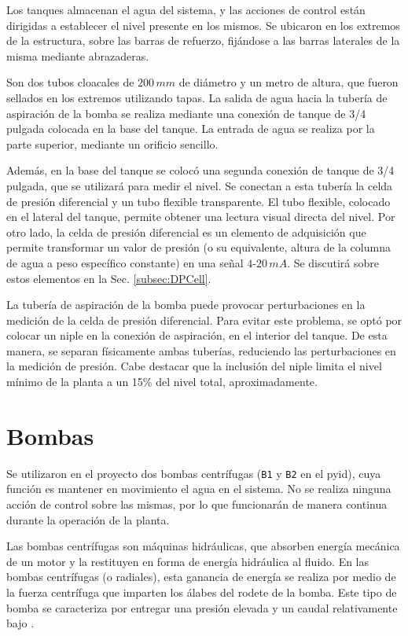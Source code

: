 Los tanques almacenan el agua del sistema, y las acciones de
control están dirigidas a establecer el nivel presente en los mismos.
Se ubicaron en los extremos de la estructura, sobre las barras de 
refuerzo, fijándose a las barras laterales de la misma mediante
abrazaderas.

Son dos tubos cloacales de $200\,mm$ de diámetro y un metro de altura, que
fueron sellados en los extremos utilizando tapas.
La salida de agua hacia la tubería de aspiración de la bomba se realiza
mediante una conexión de tanque de 3/4 pulgada colocada en la base del tanque.
La entrada de agua se realiza por la parte superior, mediante un orificio
sencillo.

Además, en la base del tanque se colocó una segunda conexión de tanque de 3/4
pulgada, que se utilizará para medir el nivel.
Se conectan a esta tubería la celda de presión diferencial y un tubo
flexible transparente.
El tubo flexible, colocado en el lateral del tanque, permite obtener una
lectura visual directa del nivel.
Por otro lado, la celda de presión diferencial es un elemento de adquisición
que permite transformar un valor de presión (o su equivalente, altura de la
columna de agua a peso específico constante) en
una señal $4$-$20\,mA$.
Se discutirá sobre estos elementos en la Sec. \ref{subsec:DPCell}.

La tubería de aspiración de la bomba puede provocar
perturbaciones en la medición de la celda de presión diferencial.
Para evitar este problema, se optó por
colocar un niple en la conexión de aspiración, en el interior del tanque.
De esta manera, se separan físicamente ambas tuberías, reduciendo las
perturbaciones en la medición de presión.
Cabe destacar que la inclusión del niple limita el nivel mínimo de la planta a
un 15\% del nivel total, aproximadamente.

\section{Bombas}
\label{sec:Bombas}

Se utilizaron en el proyecto dos bombas centrífugas (\verb|B1| y \verb|B2| en
el \gls{pyid}), cuya función es
mantener en movimiento el agua en el sistema.
No se realiza ninguna acción de control sobre las
mismas, por lo que funcionarán de manera continua durante la operación de la
planta.

Las bombas centrífugas son máquinas hidráulicas, que absorben energía mecánica
de un motor y la restituyen en forma de energía hidráulica al fluido.
En las bombas centrífugas (o radiales), esta ganancia de energía se realiza por
medio de la fuerza centrífuga que imparten los álabes del rodete de la bomba.
Este tipo de bomba se caracteriza por entregar una presión elevada y un caudal
relativamente bajo \cite{bib:Mataix}.

